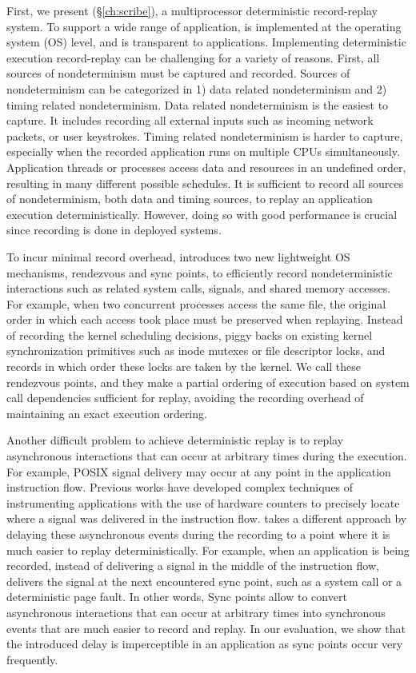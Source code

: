 First, we present \scribe (\S\ref{ch:scribe}), a multiprocessor deterministic
record-replay system. To support a wide range of application, \scribe is
implemented at the operating system (OS) level, and is transparent to applications.
Implementing deterministic execution record-replay can be challenging for a
variety of reasons. First, all sources of nondeterminism must be captured and
recorded.  Sources of nondeterminism can be categorized in 1) data related
nondeterminism and 2) timing related nondeterminism. Data related nondeterminism
is the easiest to capture. It includes recording all external inputs such as
incoming network packets, or user keystrokes. Timing related nondeterminism is
harder to capture, especially when the recorded application runs on multiple
CPUs simultaneously.  Application threads or processes access data and resources
in an undefined order, resulting in many different possible schedules. It is
sufficient to record all sources of nondeterminism, both data and timing
sources, to replay an application execution deterministically.  However, doing
so with good performance is crucial since recording is done in deployed systems.

To incur minimal record overhead, \scribe introduces two new lightweight OS
mechanisms, rendezvous and sync points, to efficiently record nondeterministic
interactions such as related system calls, signals, and shared memory accesses.
For example, when two concurrent processes access the same file, the original
order in which each access took place must be preserved when replaying.  Instead
of recording the kernel scheduling decisions, \scribe piggy backs on existing
kernel synchronization primitives such as inode mutexes or file descriptor
locks, and records in which order these locks are taken by the kernel.  We call
these rendezvous points, and they make a partial ordering of execution based on
system call dependencies sufficient for replay, avoiding the recording overhead
of maintaining an exact execution ordering.

Another difficult problem to achieve deterministic replay is to replay
asynchronous interactions that can occur at arbitrary times during the
execution. For example, POSIX signal delivery may occur at any point in the
application instruction flow. Previous works have developed complex techniques
of instrumenting applications with the use of hardware counters to precisely
locate where a signal was delivered in the instruction flow.
\scribe takes a different approach by delaying these asynchronous events
during the recording to a point where it is much easier to replay
deterministically. For example, when an application is being recorded,
instead of delivering a signal in the middle of the instruction flow, \scribe
delivers the signal at the next encountered sync point, such as a system call or
a deterministic page fault. In other words,
Sync points allow \scribe to convert asynchronous interactions that can occur at
arbitrary times into synchronous events that are much easier to record and
replay. In our evaluation, we show that the introduced delay is imperceptible
in an application as sync points occur very frequently.

